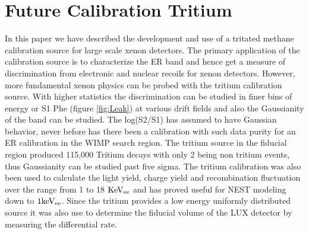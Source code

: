 \section{Future Calibration Tritium}

In this paper we have described the development and use of a tritated methane calibration source for large scale xenon detectors. The primary application of the calibration source is to characterize the ER band and hence get a measure of discrimination from electronic and nuclear recoils for xenon detectors. However, more fundamental xenon physics can be probed with the tritium calibration source. With higher statistics the discrimination can be studied in finer bins of energy or S1 Phe (figure \ref{fig:Leak}) at various drift fields and also the Gaussianity of the band can be studied. The log(S2/S1) has assumed to have Gaussian behavior, never before has there been a calibration with such data purity for an ER calibration in the WIMP search region. The tritium source in the fiducial region produced 115,000 Tritium decays with only 2 being non tritium events, thus Gaussianity can be studied past five sigma. The tritium calibration was also been used to calculate the light yield, charge yield and recombination fluctuation over the range from 1 to 18 $\rm KeV_{ee}$ and has proved useful for NEST modeling down to $\rm 1 keV_{ee}$. Since the tritium provides a low energy uniformly distributed source it was also use to determine the fiducial volume of the LUX detector by measuring the differential rate.




